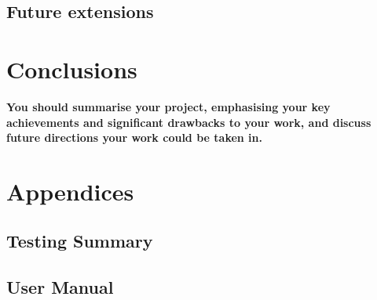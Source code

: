 \documentclass{article}
\begin{document}
\subsection{Future extensions}
\section{Conclusions}
\textbf{You should summarise your project, emphasising your
key achievements and significant drawbacks to your
work, and discuss future directions your work could be
taken in.}
\newpage


\newpage
\section*{Appendices}
\subsection*{Testing Summary}
\subsection*{User Manual}
\end{document}
